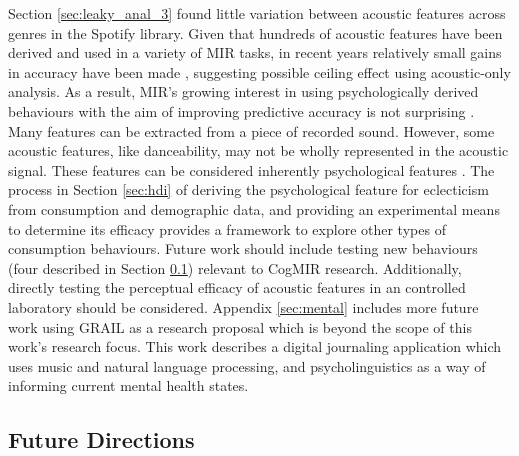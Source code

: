 \documentclass[a4paper]{article}
\begin{document}
Section \ref{sec:leaky_anal_3} found little variation between acoustic features across genres in the Spotify library. Given that hundreds of acoustic features have been derived and used in a variety of MIR tasks, in recent years relatively small gains in accuracy have been made  \cite{sturm2014state}, suggesting possible ceiling effect using acoustic-only analysis. As a result, MIR's growing interest in using psychologically derived behaviours with the aim of improving predictive accuracy is not surprising \cite{lee2004survey}. Many features can be extracted from a piece of recorded sound. However, some acoustic features, like danceability, may not be wholly represented in the acoustic signal. These features can be considered inherently psychological features \cite{friberg2014using}. The process in Section \ref{sec:hdi} of deriving the psychological feature for eclecticism from consumption and demographic data, and providing an experimental means to determine its efficacy provides a framework to explore other types of consumption behaviours. Future work should include testing new behaviours (four described in Section \ref{sec:future}) relevant to CogMIR research. Additionally, directly testing the perceptual efficacy of acoustic features in an controlled laboratory should be considered. Appendix \ref{sec:mental} includes more future work using \Gls{GRAIL} as a research proposal which is beyond the scope of this work's research focus. This work describes a digital journaling application which uses music and natural language processing, and psycholinguistics as a way of informing current mental health states.

\subsection{Future Directions}\label{sec:future}
\end{document}
